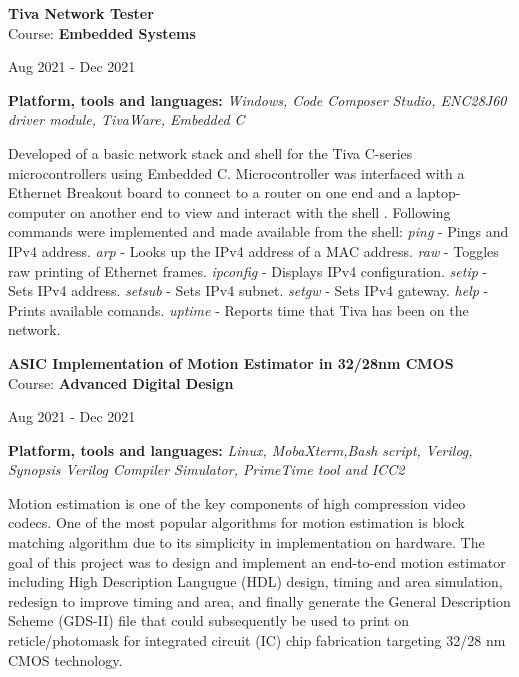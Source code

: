 \documentclass[10pt]{article}
\newenvironment{innerlist}[1][\enskip\textbullet]%
        {\begin{compactitem}[#1]}{\end{compactitem}}
\begin{document}
\textbf{Tiva Network Tester} \\ 
\vspace{2pt}
Course: \textbf{Embedded Systems} \\
\vspace*{-34pt} \begin{flushright} Aug 2021 - Dec 2021 \end{flushright}
\vspace*{-5pt}
\textbf{Platform, tools and languages:} \emph{Windows, Code Composer Studio, ENC28J60 driver module, TivaWare, Embedded C}
\vspace*{2pt}
\begin{innerlist} \item Developed of a basic network stack and shell for the Tiva C-series microcontrollers using Embedded C. Microcontroller was interfaced with a Ethernet Breakout board to connect to a router on one end and a laptop-computer on another end to view and interact with the shell . Following commands were implemented and made available from the shell:
   \subitem \emph{ping} - Pings and IPv4 address.
   \subitem \emph{arp} - Looks up the IPv4 address of a MAC address.
   \subitem \emph{raw} - Toggles raw printing of Ethernet frames.
   \subitem \emph{ipconfig} - Displays IPv4 configuration.
   \subitem \emph{setip} - Sets IPv4 address.
   \subitem \emph{setsub} - Sets IPv4 subnet.
   \subitem \emph{setgw} - Sets IPv4 gateway.
   \subitem \emph{help} - Prints available comands.
   \subitem \emph{uptime} - Reports time that Tiva has been on the network.
\end{innerlist}  \vspace*{2pt}

\textbf{ASIC Implementation of Motion Estimator in 32/28nm CMOS} \\ 
\vspace{2pt}
Course: \textbf{Advanced Digital Design} \\
\vspace*{-34pt} \begin{flushright} Aug 2021 - Dec 2021 \end{flushright}
\vspace*{-5pt}
\textbf{Platform, tools and languages:} \emph{Linux, MobaXterm,Bash script, Verilog, Synopsis Verilog Compiler Simulator, PrimeTime tool and ICC2}
\vspace*{2pt}
\begin{innerlist} \item Motion estimation is one of the key components of high compression video codecs. One of the most popular algorithms for motion estimation is block matching algorithm due to its simplicity in implementation on hardware. The goal of this project was to design and implement an end-to-end motion estimator including High Description Langugue (HDL) design, timing and area simulation, redesign to improve timing and area, and finally generate the General Description Scheme (GDS-II) file that could subsequently be used to print on reticle/photomask for integrated circuit (IC) chip fabrication targeting 32/28 nm CMOS technology.
\end{innerlist}  \vspace*{4pt}
\end{document}
